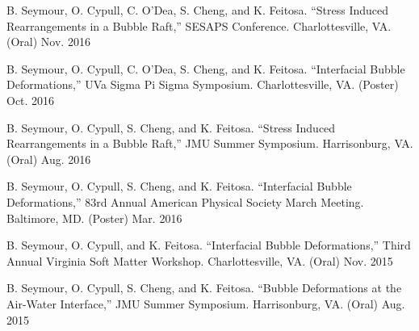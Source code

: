 \begin{cvpresentations}

  \cvpresentation
    {B. Seymour, O. Cypull, C. O’Dea, S. Cheng, and K. Feitosa. “Stress Induced Rearrangements in a Bubble Raft,” SESAPS Conference. Charlottesville, VA. (Oral)} %
    {Nov. 2016} %



  \cvpresentation
    {B. Seymour, O. Cypull, C. O’Dea, S. Cheng, and K. Feitosa. “Interfacial Bubble Deformations,” UVa Sigma Pi Sigma Symposium. Charlottesville, VA. (Poster)} %
    {Oct. 2016} %



  \cvpresentation
    {B. Seymour, O. Cypull, S. Cheng, and K. Feitosa. “Stress Induced Rearrangements in a Bubble Raft,” JMU Summer Symposium. Harrisonburg, VA. (Oral)} %
    {Aug. 2016} %



  \cvpresentation
    {B. Seymour, O. Cypull, S. Cheng, and K. Feitosa. “Interfacial Bubble Deformations,” 83rd Annual American Physical Society March Meeting. Baltimore, MD. (Poster)} %
    {Mar. 2016} %



  \cvpresentation
    {B. Seymour, O. Cypull, and K. Feitosa. “Interfacial Bubble Deformations,” Third Annual Virginia Soft Matter Workshop. Charlottesville, VA. (Oral)} %
    {Nov. 2015} %



  \cvpresentation
    {B. Seymour, O. Cypull, S. Cheng, and K. Feitosa. “Bubble Deformations at the Air-Water Interface,” JMU Summer Symposium. Harrisonburg, VA. (Oral)} %
    {Aug. 2015} %



\end{cvpresentations}
